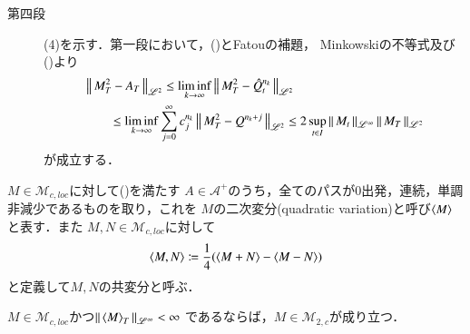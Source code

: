 \begin{prf}
\begin{description}
			\item[第四段]
				(4)を示す．第一段において，()とFatouの補題，
				Minkowskiの不等式及び()より
				\begin{align}
					&\left\|\, M_T^2 - A_T\, \right\|_{\mathscr{L}^2}
					\leq \liminf_{k \to \infty} \left\|\, M_T^2 - \hat{Q}_t^{n_k}\, \right\|_{\mathscr{L}^2} \\
					&\qquad \leq \liminf_{k \to \infty} \sum_{j=0}^{\infty} c_j^{n_k} \left\|\, M_T^2 - Q^{n_k+j}\, \right\|_{\mathscr{L}^2}
					\leq 2 \operatorname*{sup}_{t \in I} \left\|\, M_t\, \right\|_{\mathscr{L}^\infty} \left\|\, M_T\, \right\|_{\mathscr{L}^2}
				\end{align}
				が成立する．
				\QED
		\end{description}
	\end{prf}
	
	\begin{screen}
		\begin{dfn}[二次変分]
			$M \in \mathcal{M}_{c,loc}$に対して()を満たす
			$A \in \mathcal{A}^+$のうち，全てのパスが$0$出発，連続，単調非減少であるものを取り，これを
			$M$の二次変分(quadratic variation)と呼び$\inprod<M>$と表す．また
			$M,N \in \mathcal{M}_{c,loc}$に対して
			\begin{align}
				\inprod<M,N> \coloneqq \frac{1}{4} (\inprod<M+N> - \inprod<M-N>)
			\end{align}
			と定義して$M,N$の共変分と呼ぶ．
		\end{dfn}
	\end{screen}

	\begin{screen}
		\begin{thm}[二次変分が有界な連続局所マルチンゲールは連続な二乗可積分マルチンゲール]
			$M \in \mathcal{M}_{c,loc}$かつ$\Norm{\inprod<M>_T}{\mathscr{L}^{\infty}} < \infty$
			であるならば，$M \in \mathcal{M}_{2,c}$が成り立つ．
			\label{thm:quadratic_variation_bounded_then_M_2c}
		\end{thm}
	\end{screen}
	
